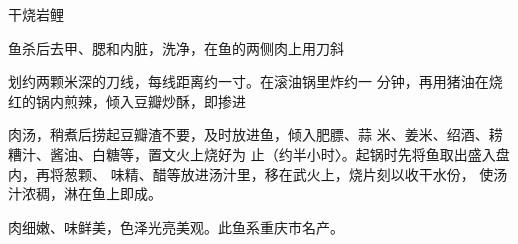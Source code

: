 \begin{recipe}{干烧岩鲤}

\ingredients





\cooking

鱼杀后去甲、腮和内脏，洗净，在鱼的两侧肉上用刀斜

划约两颗米深的刀线，每线距离约一寸。在滚油锅里炸约一 分钟，再用猪油在烧红的锅内煎辣，倾入豆瓣炒酥，即掺进

肉汤，稍煮后捞起豆瓣渣不要，及时放进鱼，倾入肥膘、蒜 米、姜米、绍酒、耢糟汁、酱油、白糖等，置文火上烧好为 止（约半小时〉。起锅时先将鱼取出盛入盘内，再将葱颗、 味精、醋等放进汤汁里，移在武火上，烧片刻以收干水份， 使汤汁浓稠，淋在鱼上即成。

\notes

肉细嫩、味鲜美，色泽光亮美观。此鱼系重庆市名产。

\end{recipe}

